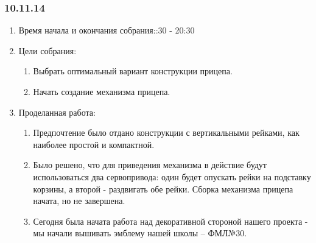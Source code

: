 
\subsubsection{10.11.14}

\begin{enumerate} 
	\item Время начала и окончания собрания::30 - 20:30
	\item Цели собрания:\newline
	\begin{enumerate}
		\item Выбрать оптимальный вариант конструкции прицепа.\newline
		
		\item Начать создание механизма прицепа.\newline
		
	\end{enumerate}
	
	\item Проделанная работа:\newline
	\begin{enumerate}
		\item Предпочтение было отдано конструкции с вертикальными рейками, как наиболее простой и компактной.\newline
		
		\item Было решено, что для приведения механизма в действие будут использоваться два сервопривода: один будет опускать рейки на подставку корзины, а второй - раздвигать обе рейки. Сборка механизма прицепа начата, но не завершена.\newline
		
		\item Сегодня была начата работа над декоративной стороной нашего проекта - мы начали вышивать эмблему нашей школы -- ФМЛ№30.\newline
		

\end{enumerate}
\end{enumerate}
